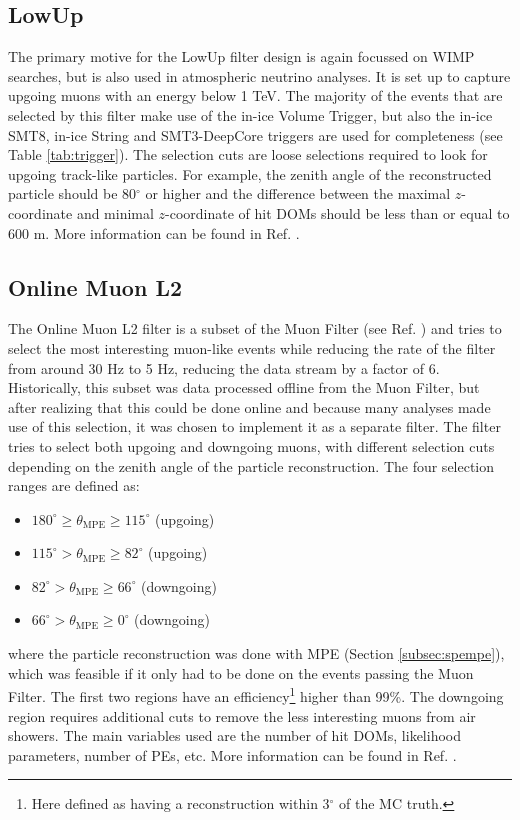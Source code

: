 
\subsection{LowUp}
The primary motive for the LowUp filter design is again focussed on WIMP searches, but is also used in atmospheric neutrino analyses. It is set up to capture upgoing muons with an energy below 1 TeV. The majority of the events that are selected by this filter make use of the in-ice Volume Trigger, but also the in-ice SMT8, in-ice String and SMT3-DeepCore triggers are used for completeness (see Table \ref{tab:trigger}). The selection cuts are loose selections required to look for upgoing track-like particles. For example, the zenith angle of the reconstructed particle should be 80$^\circ$ or higher and the difference between the maximal $z$-coordinate and minimal $z$-coordinate of hit DOMs should be less than or equal to 600 m. More information can be found in Ref. \cite{LowUp2012}.


\subsection{Online Muon L2}
The Online Muon L2 filter is a subset of the Muon Filter (see Ref. \cite{muon2012filter}) and tries to select the most interesting muon-like events while reducing the rate of the filter from around 30 Hz to 5 Hz, reducing the data stream by a factor of 6. Historically, this subset was data processed offline from the Muon Filter, but after realizing that this could be done online and because many analyses made use of this selection, it was chosen to implement it as a separate filter. The filter tries to select both upgoing and downgoing muons, with different selection cuts depending on the zenith angle of the particle reconstruction. The four selection ranges are defined as:
\vspace{2mm}
\begin{itemize}
\item $180^\circ \geq \theta_\textrm{MPE} \geq 115^\circ$ (upgoing)
\item $115^\circ > \theta_\textrm{MPE} \geq 82^\circ$ (upgoing)
\item $82^\circ > \theta_\textrm{MPE} \geq 66^\circ$ (downgoing)
\item $66^\circ > \theta_\textrm{MPE} \geq 0^\circ$ (downgoing)
\end{itemize}
\vspace{2mm}
where the particle reconstruction was done with MPE (Section \ref{subsec:spempe}), which was feasible if it only had to be done on the events passing the Muon Filter. The first two regions have an efficiency\footnote{Here defined as having a reconstruction within 3$^\circ$ of the MC truth.} higher than 99\%. The downgoing region requires additional cuts to remove the less interesting muons from air showers. The main variables used are the number of hit DOMs, likelihood parameters, number of PEs, etc. More information can be found in Ref. \cite{OnlineMuonL22012}.

